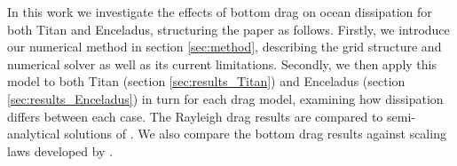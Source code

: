 In this work we investigate the effects of bottom drag on ocean dissipation for both Titan and Enceladus, structuring the paper as follows. Firstly, we introduce our numerical method in section \ref{sec:method}, describing the grid structure and numerical solver as well as its current limitations. Secondly, we then apply this model to both Titan (section \ref{sec:results_Titan}) and Enceladus (section \ref{sec:results_Enceladus}) in turn for each drag model, examining how dissipation differs between each case. The Rayleigh drag results are compared to semi-analytical solutions of \citet{matsuyama2014tidal}. We also compare the bottom drag results against scaling laws developed by \citep{chen2013tidal}.




